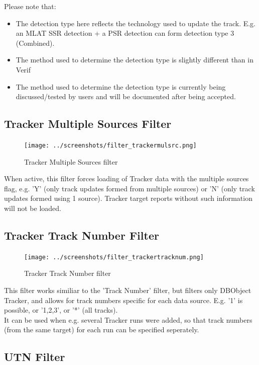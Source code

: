Please note that:
\begin{itemize}
 \item The detection type here reflects the technology used to update the track. E.g. an MLAT SSR detection + a PSR detection can form detection type 3 (Combined).
 \item The method used to determine the detection type is slightly different than in Verif
 \item The method used to determine the detection type is currently being discussed/tested by users and will be documented after being accepted.
\end{itemize}

\subsection{Tracker Multiple Sources Filter}

\begin{figure}[H]
  \center
    \texttt{[image: ../screenshots/filter\_trackermulsrc.png]}
  \caption{Tracker Multiple Sources filter}
\end{figure}

When active, this filter forces loading of Tracker data with the multiple sources flag, e.g. 'Y' (only track updates formed from multiple sources) or 'N' (only track updates formed using 1 source). Tracker target reports without such information will not be loaded.

\subsection{Tracker Track Number Filter}

\begin{figure}[H]
  \center
    \texttt{[image: ../screenshots/filter\_trackertracknum.png]}
  \caption{Tracker Track Number filter}
\end{figure}

This filter works similiar to the 'Track Number' filter, but filters only DBObject Tracker, and allows for track numbers specific for each data source. E.g. '1' is possible, or '1,2,3', or '*' (all tracks).\\

It can be used when e.g. several Tracker runs were added, so that track numbers (from the same target) for each run can be specified seperately. \\

\subsection{UTN Filter}

